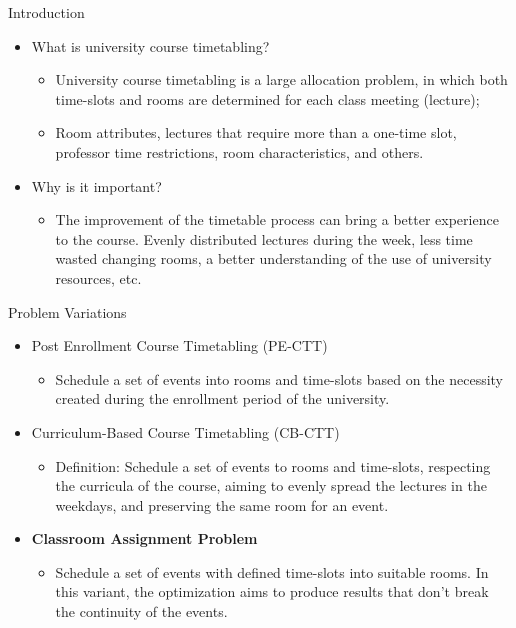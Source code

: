 \documentclass{beamer}
\begin{document}
\begin{frame}{Introduction}
\begin{itemize}
    \item What is university course timetabling? \begin{itemize}
        \item University course timetabling is a large allocation problem, in which both time-slots and rooms are determined for each class meeting (lecture);
        \item Room attributes, lectures that require more than a one-time slot, professor time restrictions, room characteristics, and others.
    \end{itemize}
    \item Why is it important?
    \begin{itemize}
        \item The improvement of the timetable process can bring a better experience to the course. Evenly distributed lectures during the week, less time wasted changing rooms, a better understanding of the use of university resources, etc.
    \end{itemize}
\end{itemize}
\end{frame}


\begin{frame}{Problem Variations}
\begin{itemize}
\item Post Enrollment Course Timetabling (PE-CTT)
    \begin{itemize}
    \item Schedule a set of events into rooms and time-slots based on the necessity created during the enrollment period of the university.
    \end{itemize}
\item Curriculum-Based Course Timetabling (CB-CTT)
    \begin{itemize}
    \item Definition: Schedule a set of events to rooms and time-slots, respecting the curricula of the course, aiming to evenly spread the lectures in the weekdays, and preserving the same room for an event.
    \end{itemize}
\item \textbf{Classroom Assignment Problem}
    \begin{itemize}
    \item Schedule a set of events with defined time-slots into suitable rooms. In this variant, the optimization aims to produce results that don't break the continuity of the events.
    \end{itemize}
\end{itemize}
\end{frame}
\end{document}
